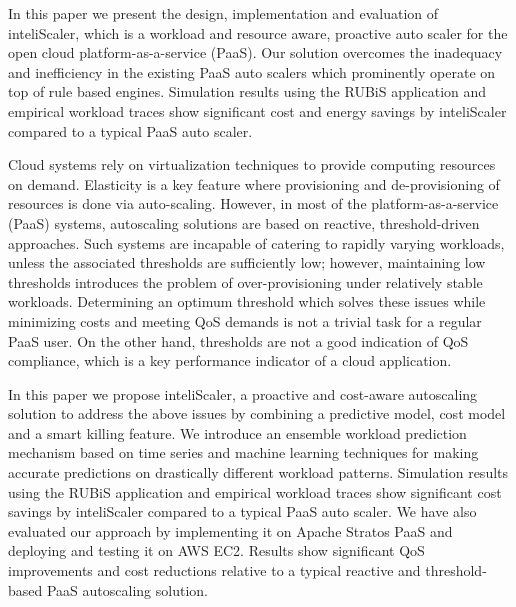 In this paper we present the design, implementation and evaluation of inteliScaler, which is a workload and resource aware, proactive auto scaler for the open cloud platform-as-a-service (PaaS). Our solution overcomes the inadequacy and inefficiency in the existing PaaS auto scalers which prominently operate on top of rule based engines. Simulation results using the RUBiS application and empirical workload traces show significant cost and energy savings by inteliScaler compared to a typical PaaS auto scaler.

Cloud systems rely on virtualization techniques to provide computing resources on demand. Elasticity is a key feature where provisioning and de-provisioning of resources is done via auto-scaling. However, in most of the platform-as-a-service (PaaS) systems, autoscaling solutions are based on reactive, threshold-driven approaches. Such systems are incapable of catering to rapidly varying workloads, unless the associated thresholds are sufficiently low; however, maintaining low thresholds introduces the problem of over-provisioning under relatively stable workloads. Determining an optimum threshold which solves these issues while minimizing costs and meeting QoS demands is not a trivial task for a regular PaaS user. On the other hand, thresholds are not a good indication of QoS compliance, which is a key performance indicator of a cloud application.

In this paper we propose inteliScaler, a proactive and cost-aware autoscaling solution to address the above issues by combining a predictive model, cost model and a smart killing feature. We introduce an ensemble workload prediction mechanism based on time series and machine learning techniques for making accurate predictions on drastically different workload patterns. Simulation results using the RUBiS application and empirical workload traces show significant cost savings by inteliScaler compared to a typical PaaS auto scaler. We have also evaluated our approach by implementing it on Apache Stratos PaaS and deploying and testing it on AWS EC2. Results show significant QoS improvements and cost reductions relative to a typical reactive and threshold-based PaaS autoscaling solution.